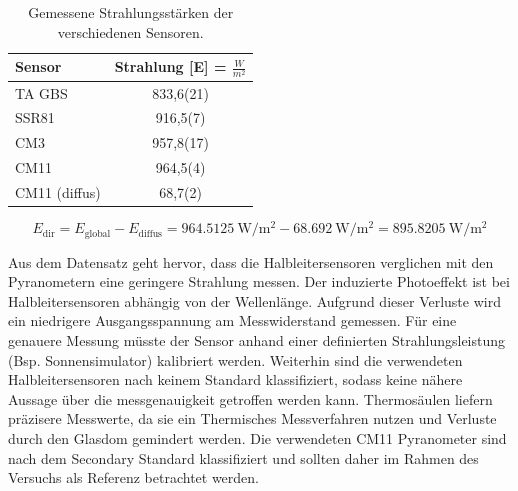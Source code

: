\begin{table}[H]
	\centering
	\caption{Gemessene Strahlungsstärken der verschiedenen Sensoren.}
\begin{tabular}{l S[separate-uncertainty,table-parse-only,table-figures-uncertainty = 1]}
	\toprule
	\textbf{Sensor} & \textbf{Strahlung [E] = $\frac{W}{m^2}$}\\
	\midrule
		TA GBS & 833,6(21)\\
		SSR81 & 916,5(7)\\
		CM3 & 957,8(17)\\
		CM11 & 964,5(4)\\
		CM11 (diffus) & 68,7(2)\\
		\bottomrule
\end{tabular} 

	\label{tab:radiation}
\end{table}

\begin{equation}
	\label{eq:Edir}
	E_{\text{dir}}=E_{\text{global}}-E_{\text{diffus}}=\SI{964.5125}{\watt\per\square\meter}-\SI{68.692}{\watt\per\square\meter} = \SI{895.8205}{\watt\per\square\meter}
\end{equation}

Aus dem Datensatz geht hervor, dass die Halbleitersensoren verglichen mit den Pyranometern eine geringere Strahlung messen. Der induzierte Photoeffekt ist bei Halbleitersensoren abhängig von der Wellenlänge. Aufgrund dieser Verluste wird ein niedrigere Ausgangsspannung am Messwiderstand gemessen. Für eine genauere Messung müsste der Sensor anhand einer definierten Strahlungsleistung (Bsp. Sonnensimulator) kalibriert werden. Weiterhin sind die verwendeten Halbleitersensoren nach keinem Standard klassifiziert, sodass keine nähere Aussage über die messgenauigkeit getroffen werden kann. Thermosäulen liefern präzisere Messwerte, da sie ein Thermisches Messverfahren nutzen und Verluste durch den Glasdom gemindert werden. Die verwendeten CM11 Pyranometer sind nach dem Secondary Standard klassifiziert und sollten daher im Rahmen des Versuchs als Referenz betrachtet werden.


